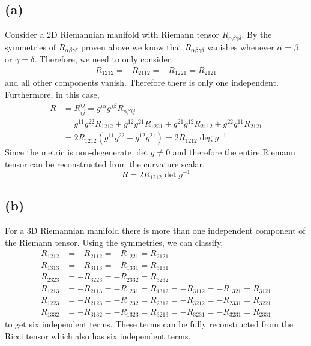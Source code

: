 \documentclass[12pt]{article}
\begin{document}
\subsection*{(a)}

Consider a 2D Riemannian manifold with Riemann tensor $R_{\alpha \beta \gamma \delta}$. 
By the symmetries of $R_{\alpha \beta \gamma \delta}$ proven above we know that $R_{\alpha \beta \gamma \delta}$ vanishes whenever $\alpha = \beta$ or $\gamma = \delta$. Therefore, we need to only consider,
\begin{align*}
R_{1212} = - R_{2112} = - R_{1221} = R_{2121}
\end{align*}
and all other components vanish. Therefore there is only one independent. Furthermore, in this case,
\begin{align*}
R & = R^{ij}_{ij} = g^{i \alpha} g^{j \beta} R_{\alpha \beta i j} 
\\
& = g^{11} g^{22} R_{1212} + g^{12} g^{21} R_{1221} + g^{21} g^{12} R_{2112} + g^{22} g^{11} R_{2121} 
\\
& = 2 R_{1212} \left( g^{11} g^{22} - g^{12} g^{21} \right) = 2 R_{1212} \deg{g^{-1}} 
\end{align*}
Since the metric is non-degenerate $\det{g} \neq 0$ and therefore the entire Riemann tensor can be reconstructed from the curvature scalar,
\[ R = 2 R_{1212} \det{g^{-1}} \]

\subsection*{(b)}

For a 3D Riemannian manifold there is more than one independent component of the Riemann tensor. Using the symmetries, we can classify,
\begin{align*}
R_{1212} & = - R_{2112} = - R_{1221} = R_{2121}
\\
R_{1313} & = - R_{3113} = - R_{1331} = R_{3131}
\\
R_{2323} & = - R_{3223} = - R_{2332} = R_{3232}
\\
R_{1213} & = - R_{2113} = - R_{1231} = R_{1312} = - R_{3112} = - R_{1321} = R_{3121}
\\
R_{1223} & = - R_{2123} = - R_{1232} = R_{2312} = - R_{3212} = -R_{2331} = R_{3221}
\\
R_{1332} & = - R_{3132} = - R_{1323} = R_{3213} = - R_{3231} = -R_{3231} = R_{2331}
\end{align*}
to get six independent terms. These terms can be fully reconstructed from the Ricci tensor which also has six independent terms. 
\end{document}
